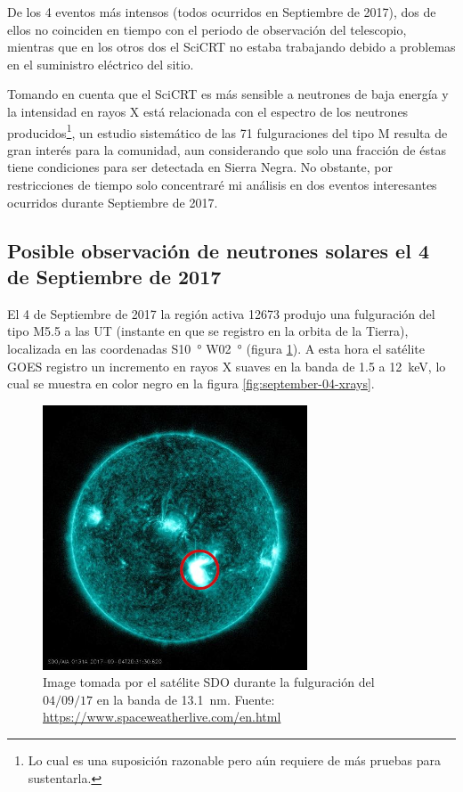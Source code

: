 De los \num{4} eventos más intensos (todos ocurridos en Septiembre de \num{2017}), dos de ellos no coinciden en tiempo con el periodo de observación del telescopio, mientras que en los otros dos el SciCRT no estaba trabajando debido a problemas en el suministro eléctrico del sitio.

Tomando en cuenta que el SciCRT es más sensible a neutrones de baja energía y la intensidad en rayos X está relacionada con el espectro de los neutrones producidos\footnote{Lo cual es una suposición razonable pero aún requiere de más pruebas para sustentarla.}, un estudio sistemático de las \num{71} fulguraciones del tipo M resulta de gran interés para la comunidad, aun considerando que solo una fracción de éstas tiene condiciones para ser detectada en Sierra Negra. No obstante, por restricciones de tiempo solo concentraré mi análisis en dos eventos interesantes ocurridos durante Septiembre de \num{2017}.

\subsection{Posible observación de neutrones solares el 4 de Septiembre de 2017}

El \num{4} de Septiembre de \num{2017} la región activa \num{12673} produjo una fulguración del tipo M\num{5.5} a las  UT (instante en que se registro en la orbita de la Tierra), localizada  en las coordenadas S\SI{10}{\degree} W\SI{02}{\degree} (figura \ref{fig:september-04-flare}). A esta hora el satélite GOES registro un incremento en rayos X suaves en la banda de \num{1.5} a \SI{12}{\kilo\electronvolt}, lo cual se muestra en color negro en la figura \ref{fig:september-04-xrays}.

\begin{figure}
        \centering
        \includegraphics[width=0.7\textwidth]{sdo170904-2030-13}
        \caption{Image tomada por el satélite SDO durante la fulguración del $04/09/17$ en la banda de \SI{13.1}{\nano\metre}. Fuente: \url{https://www.spaceweatherlive.com/en.html}}
        \label{fig:september-04-flare}
\end{figure}

